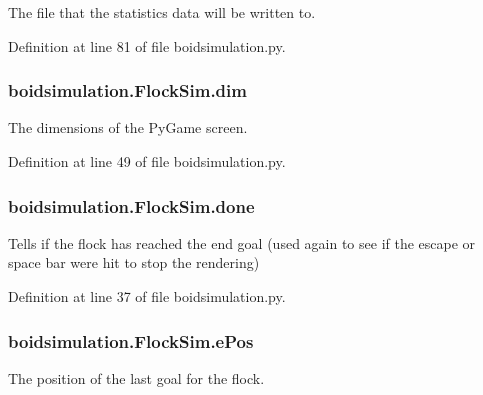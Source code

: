 The file that the statistics data will be written to. 



Definition at line 81 of file boidsimulation.\-py.

\hypertarget{classboidsimulation_1_1FlockSim_a2ba5ffd4d4ef009af8735d838eaf59d3}{
\subsubsection[{dim}]{\setlength{\rightskip}{0pt plus 5cm}boidsimulation.\-Flock\-Sim.\-dim}}\label{classboidsimulation_1_1FlockSim_a2ba5ffd4d4ef009af8735d838eaf59d3}


The dimensions of the Py\-Game screen. 



Definition at line 49 of file boidsimulation.\-py.

\hypertarget{classboidsimulation_1_1FlockSim_a970e9fcbc5d69b3987f226af5249038a}{
\subsubsection[{done}]{\setlength{\rightskip}{0pt plus 5cm}boidsimulation.\-Flock\-Sim.\-done}}\label{classboidsimulation_1_1FlockSim_a970e9fcbc5d69b3987f226af5249038a}


Tells if the flock has reached the end goal (used again to see if the escape or space bar were hit to stop the rendering) 



Definition at line 37 of file boidsimulation.\-py.

\hypertarget{classboidsimulation_1_1FlockSim_acb064f74364917a97ca9d3accdf96f45}{
\subsubsection[{e\-Pos}]{\setlength{\rightskip}{0pt plus 5cm}boidsimulation.\-Flock\-Sim.\-e\-Pos}}\label{classboidsimulation_1_1FlockSim_acb064f74364917a97ca9d3accdf96f45}


The position of the last goal for the flock. 



